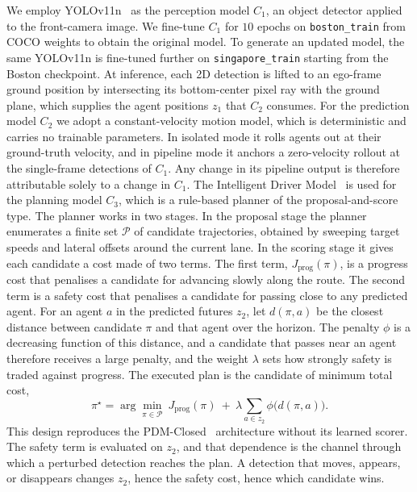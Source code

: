 \documentclass[conference]{IEEEtran}
\begin{document}
We employ YOLOv11n~\cite{jocher2024yolo11} as the perception model $C_1$, an
object detector applied to the front-camera image. We fine-tune $C_1$ for $10$
epochs on
\texttt{boston\_train} from COCO weights to obtain the original model. To generate
an updated model, the same YOLOv11n is fine-tuned further on
\texttt{singapore\_train} starting from the Boston checkpoint. At inference, each 2D detection is lifted to an
ego-frame ground position by intersecting its bottom-center pixel ray with the
ground plane, which supplies the agent positions $z_1$ that $C_2$ consumes. For the
prediction model $C_2$ we adopt a constant-velocity motion model, which is
deterministic and carries no trainable parameters. In isolated mode it rolls agents out at their ground-truth velocity, and
in pipeline mode it anchors a zero-velocity rollout at the single-frame detections
of $C_1$. Any change in its pipeline output is therefore attributable solely to a
change in $C_1$. The Intelligent Driver Model~\cite{treiber2000idm} is used for
the planning model $C_3$, which is a rule-based planner of the proposal-and-score
type. The planner works in two stages. In the proposal stage the planner enumerates a
finite set $\mathcal{P}$ of candidate trajectories, obtained by sweeping target speeds
and lateral offsets around the current lane. In the scoring stage it gives each
candidate a cost made of two terms. The first term, $J_{\text{prog}}(\pi)$, is a progress cost that
penalises a candidate for advancing slowly along the route. The second term is a
safety cost that penalises a candidate for passing close to any predicted agent. For
an agent $a$ in the predicted futures $z_2$, let $d(\pi,a)$ be the closest distance
between candidate $\pi$ and that agent over the horizon. The penalty $\phi$ is a
decreasing function of this distance, and a candidate that passes near an agent
therefore receives a large penalty, and the weight $\lambda$ sets how strongly safety is traded
against progress. The executed plan is the candidate of minimum total cost,
\begin{equation}
\pi^{\star} = \arg\min_{\pi \in \mathcal{P}}\
J_{\text{prog}}(\pi)
\ +\ \lambda \!\!\sum_{a \in z_2} \phi\bigl(d(\pi, a)\bigr).
\label{eq:idm}
\end{equation}
This design reproduces the PDM-Closed~\cite{dauner2023parting} architecture without
its learned scorer. The safety term is evaluated on $z_2$, and that dependence is the
channel through which a perturbed detection reaches the plan. A detection that moves, appears, or
disappears changes $z_2$, hence the safety cost, hence which candidate wins.
\end{document}
